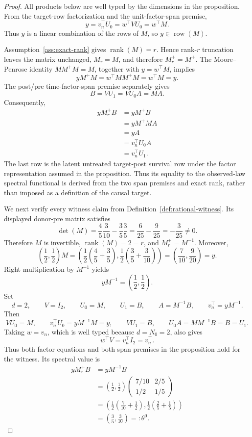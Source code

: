 \documentclass{article}
\begin{document}
\begin{proof}
All products below are well typed by the dimensions in the proposition.  From the target-row factorization and the unit-factor-span premise,
\[
y=v_n^\top U_0=w^\top VU_0=w^\top M.
\]
Thus \(y\) is a linear combination of the rows of \(M\), so \(y\in\operatorname{row}(M)\).

Assumption~\ref{ass:exact-rank} gives \(\operatorname{rank}(M)=r\).  Hence rank-\(r\) truncation leaves the matrix unchanged, \(M_r=M\), and therefore \(M_r^+=M^+\).  The Moore--Penrose identity \(MM^+M=M\), together with \(y=w^\top M\), implies
\[
yM^+M=w^\top MM^+M=w^\top M=y.
\]
The post/pre time-factor-span premise separately gives
\[
B=VU_1=VU_0A=MA.
\]
Consequently,
\[
\begin{aligned}
yM_r^+B
&=yM^+B\\
&=yM^+MA\\
&=yA\\
&=v_n^\top U_0A\\
&=v_n^\top U_1.
\end{aligned}
\]
The last row is the latent untreated target-post survival row under the factor representation assumed in the proposition.  Thus its equality to the observed-law spectral functional is derived from the two span premises and exact rank, rather than imposed as a definition of the causal target.

We next verify every witness claim from Definition~\ref{def:rational-witness}.  Its displayed donor-pre matrix satisfies
\[
\det(M)=\frac45\frac3{10}-\frac35\frac35
=\frac6{25}-\frac9{25}
=-\frac3{25}\ne0.
\]
Therefore \(M\) is invertible, \(\operatorname{rank}(M)=2=r\), and \(M_r^+=M^{-1}\).  Moreover,
\[
\left(\frac12,\frac12\right)M
=\left(
\frac12\left(\frac45+\frac35\right),
\frac12\left(\frac35+\frac3{10}\right)
\right)
=\left(\frac7{10},\frac9{20}\right)
=y.
\]
Right multiplication by \(M^{-1}\) yields
\[
yM^{-1}=\left(\frac12,\frac12\right).
\]
Set
\[
d=2,\qquad V=I_2,\qquad U_0=M,\qquad U_1=B,
\qquad A=M^{-1}B,\qquad v_n^\top=yM^{-1}.
\]
Then
\[
VU_0=M,\qquad v_n^\top U_0=yM^{-1}M=y,
\qquad VU_1=B,\qquad U_0A=MM^{-1}B=B=U_1.
\]
Taking \(w=v_n\), which is well typed because \(d=N_0=2\), also gives
\[
w^\top V=v_n^\top I_2=v_n^\top.
\]
Thus both factor equations and both span premises in the proposition hold for the witness.  Its spectral value is
\[
\begin{aligned}
yM_r^+B
&=yM^{-1}B\\
&=\left(\frac12,\frac12\right)
\begin{pmatrix}7/10&2/5\\1/2&1/5\end{pmatrix}\\
&=\left(
\frac12\left(\frac7{10}+\frac12\right),
\frac12\left(\frac25+\frac15\right)
\right)\\
&=\left(\frac35,\frac3{10}\right)=:\theta^0.
\end{aligned}
\]


\end{proof}
\end{document}
